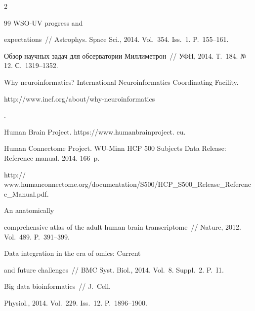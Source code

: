 \begin{multicols}{2}
{{\begin{thebibliography}{99}
 WSO-UV progress and 


expectations~// Astrophys. Space Sci., 2014. Vol.~354. Iss.~1. P.~155--161.






Обзор научных задач для обсерватории Миллиметрон~// УФН, 2014. Т.~184. №\,12. С.~1319--1352.







Why neuroinformatics? International Neuroinformatics Coordinating Facility. {\sf 


http://www.incf.org/about/why-neuroinformatics}.




Human Brain Project. {\sf https://www.humanbrainproject. eu}.




Human Connectome Project. WU-Minn HCP 500 Subjects Data Release: Reference manual. 2014. 166~p. 


{\sf http:// www.humanconnectome.org/documentation/S500/\linebreak HCP\_S500\_Release\_Reference\_Manual.pdf}.




 An anatomically 


comprehensive atlas of the adult human brain transcriptome~// Nature, 2012. Vol.~489. P.~391--399.




 Data integration in the era of omics: Current 


and future challenges~// BMC Syst. Biol., 2014. Vol.~8. Suppl.~2. P.~I1.




 Big data bioinformatics~// J.~Cell. 


Physiol., 2014. Vol.~229. Iss.~12. P.~1896--1900.






\end{thebibliography}}}
\end{multicols}
